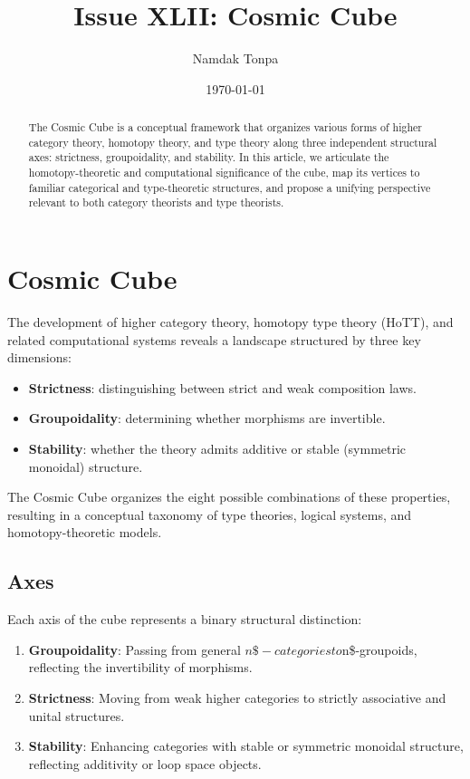 \documentclass{article}
\begin{document}
\title{Issue XLII: Cosmic Cube}
\author{Namdak Tonpa}
\date{\today}

\maketitle

\begin{abstract}
The Cosmic Cube is a conceptual framework that organizes various forms of higher category theory, homotopy theory, and type theory along three independent structural axes: strictness, groupoidality, and stability. In this article, we articulate the homotopy-theoretic and computational significance of the cube, map its vertices to familiar categorical and type-theoretic structures, and propose a unifying perspective relevant to both category theorists and type theorists.
\end{abstract}

\ifincludeTOC
  \tableofcontents
\fi

\section{Cosmic Cube}
The development of higher category theory, homotopy type theory (HoTT), and related computational systems reveals a landscape structured by three key dimensions:

\begin{itemize}
\item \textbf{Strictness}: distinguishing between strict and weak composition laws.
\item \textbf{Groupoidality}: determining whether morphisms are invertible.
\item \textbf{Stability}: whether the theory admits additive or stable (symmetric monoidal) structure.
\end{itemize}

The Cosmic Cube organizes the eight possible combinations of these properties, resulting in a conceptual taxonomy of type theories, logical systems, and homotopy-theoretic models.

\subsection{Axes}

Each axis of the cube represents a binary structural distinction:

\begin{enumerate}
\item \textbf{Groupoidality}: Passing from general $n\$-categories to $n\$-groupoids, reflecting the invertibility of morphisms.
\item \textbf{Strictness}: Moving from weak higher categories to strictly associative and unital structures.
\item \textbf{Stability}: Enhancing categories with stable or symmetric monoidal structure, reflecting additivity or loop space objects.
\end{enumerate}
\end{document}
